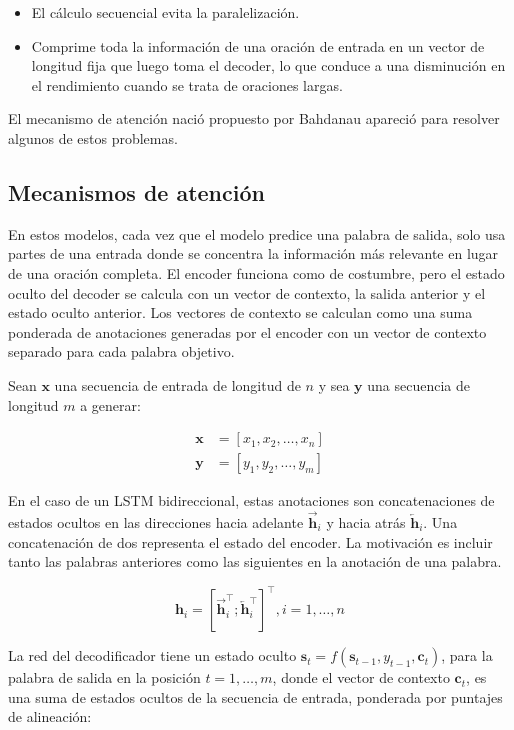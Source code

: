 \documentclass[conference]{IEEEtran}
\begin{document}
\begin{itemize}
\item El c\'alculo secuencial evita la paralelizaci\'on.
	\item Comprime toda la informaci\'on de una oraci\'on de entrada en un vector de longitud fija que luego toma el decoder, lo que conduce a una disminuci\'on en el rendimiento cuando se trata de oraciones largas. 
\end{itemize}

El mecanismo de atenci\'on naci\'o propuesto por Bahdanau \cite{b2} apareci\'o para resolver algunos de estos problemas.

\subsection{Mecanismos de atenci\'on}

En estos modelos, cada vez que el modelo predice una palabra de salida, solo usa partes de una entrada donde se concentra la información m\'as relevante en lugar de una oraci\'on completa. El encoder funciona como de costumbre, pero el estado oculto del decoder se calcula con un vector de contexto, la salida anterior y el estado oculto anterior. Los vectores de contexto se calculan como una suma ponderada de anotaciones generadas por el encoder con un vector de contexto separado para cada palabra objetivo. 


Sean $\mathbf{x}$ una secuencia de entrada de longitud de $n$ y sea $\mathbf{y}$ una secuencia de longitud $m$ a generar:



\begin{align*}
	\mathbf{x} &= [x_1, x_2, \dots, x_n] \\
	\mathbf{y} &= [y_1, y_2, \dots, y_m]
\end{align*}

En el caso de un LSTM bidireccional, estas anotaciones son concatenaciones de estados ocultos en las direcciones hacia adelante $\overrightarrow{\boldsymbol{h}}_i$ y hacia atr\'as $\overleftarrow{\boldsymbol{h}}_i$. Una concatenaci\'on de dos representa el estado del encoder. La motivaci\'on es incluir tanto las palabras anteriores como las siguientes en la anotaci\'on de una palabra.

\[
\boldsymbol{h}_i = [\overrightarrow{\boldsymbol{h}}_i^\top; \overleftarrow{\boldsymbol{h}}_i^\top]^\top, i=1,\dots,n
\]


La red del decodificador tiene un estado oculto $\boldsymbol{s}_t=f(\boldsymbol{s}_{t-1}, y_{t-1}, \mathbf{c}_t)$, para la palabra de salida en la posici\'on $t=1,\dots,m$, donde el vector de contexto $\mathbf{c}_t$, es una suma de estados ocultos de la  secuencia de entrada, ponderada por puntajes de alineaci\'on:
\end{document}
